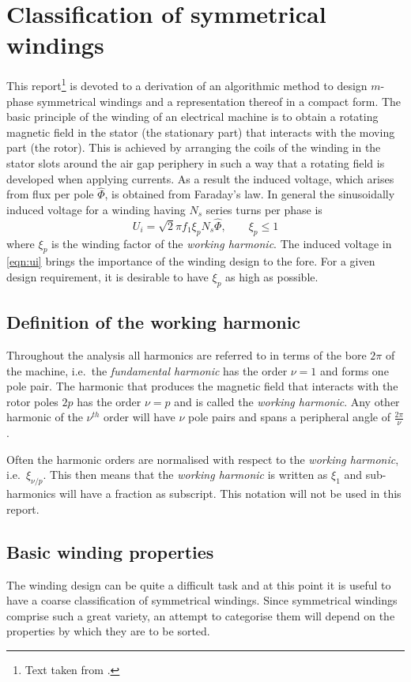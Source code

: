 \chapter{Classification of symmetrical windings}
This report\footnote{Text taken from \cite{REF-00014}.} is devoted to a derivation of an algorithmic method to design $m$-phase symmetrical windings and a representation thereof in a compact form. The basic principle of the winding of an electrical machine is to obtain a rotating magnetic field in the stator (the stationary part) that interacts with the moving part (the rotor). This is achieved by arranging the coils of the winding in the stator slots around the air gap periphery in such a way that a rotating field is developed when applying currents. As a result the induced voltage, which arises from flux per pole $\hat{\Phi}$, is obtained from Faraday's law. In general the sinusoidally induced voltage for a winding having $N_s$ series turns per phase is
\begin{equation}
  \label{eqn:ui}
  U_i = \sqrt{2} \pi f_1 \xi_p N_s \hat{\Phi}, \qquad \xi_p \leq 1
\end{equation}
where $\xi_p$ is the winding factor of the \textit{working harmonic}. The induced voltage in \eqref{eqn:ui} brings the importance of the winding design to the fore. For a given design requirement, it is desirable to have $\xi_p$ as high as possible.

\section{Definition of the working harmonic}\label{sec:working_harmonic}
Throughout the analysis all harmonics are referred to in terms of the bore $2\pi$ of the machine, i.e.~the \textit{fundamental harmonic} has the order $\nu=1$ and forms one pole pair. The harmonic that produces the magnetic field that interacts with the rotor poles $2p$ has the order $\nu=p$ and is called the \textit{working harmonic}. Any other harmonic of the $\nu^{th}$ order will have $\nu$ pole pairs and spans a peripheral angle of $\frac{2\pi}{\nu}$.

Often the harmonic orders are normalised with respect to the \textit{working harmonic}, i.e.~$\xi_{\nu /p}$. This then means that the \textit{working harmonic} is written as $\xi_1$ and sub-harmonics will have a fraction as subscript. This notation will not be used in this report.

\section{Basic winding properties}%
\label{sec:m_phases}
The winding design can be quite a difficult task and at this point it is useful to have a coarse classification of symmetrical windings. Since symmetrical windings comprise such a great variety, an attempt to categorise them will depend on the properties by which they are to be sorted. 

